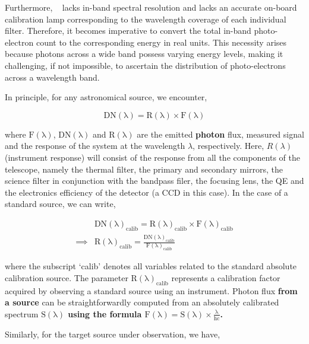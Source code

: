 Furthermore, \suit~ lacks in-band spectral resolution and lacks an accurate on-board calibration lamp corresponding to the wavelength coverage of each individual filter. Therefore, it becomes imperative to convert the total in-band photo-electron count to the corresponding energy in real units. This necessity arises because photons across a wide band possess varying energy levels, making it challenging, if not impossible, to ascertain the distribution of photo-electrons across a wavelength band.

In principle, for any astronomical source, we encounter,

\begin{equation*}
    \mathrm{DN(\lambda) = R(\lambda) \times F(\lambda)}
\end{equation*}

where $\mathrm{F(\lambda)}$, $\mathrm{DN(\lambda)}$ and $\mathrm{R(\lambda)}$ are the emitted {\bf photon} flux, measured signal and the response of the system at the wavelength $\lambda$, respectively. Here, $R(\lambda)$ (instrument response) will consist of the response from all the components of the telescope, namely the thermal filter, the primary and secondary mirrors, the science filter in conjunction with the bandpass filer, the focusing lens, the QE and the electronics efficiency of the detector (a CCD in this case). In the case of a standard source, we can write,

\begin{align*}
    &\mathrm{DN(\lambda)_{calib} = R(\lambda)_{calib} \times F(\lambda)_{calib}} \\
    \implies &\mathrm{R(\lambda)_{calib} = \frac{DN(\lambda)_{calib}}{F(\lambda)_{calib}}}
\end{align*}

\noindent where the subscript `calib' denotes all variables related to the standard absolute calibration source. The parameter $\mathrm{R(\lambda)_{calib}}$ represents a calibration factor acquired by observing a standard source using an instrument. Photon flux {\bf from a source} can be straightforwardly computed from an absolutely calibrated spectrum {\bf $\mathrm{S(\lambda)}$ using the formula $\mathrm{F(\lambda) = S(\lambda) \times \frac{\lambda}{hc}}$.}

Similarly, for the target source under observation, we have,

